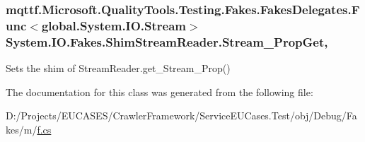 \hypertarget{class_system_1_1_i_o_1_1_fakes_1_1_shim_stream_reader_a8750bbc521c0510e122337b518f78aae}{
\subsubsection[{Stream\-\_\-\-Prop\-Get}]{\setlength{\rightskip}{0pt plus 5cm}mqttf.\-Microsoft.\-Quality\-Tools.\-Testing.\-Fakes.\-Fakes\-Delegates.\-Func$<$global.\-System.\-I\-O.\-Stream$>$ System.\-I\-O.\-Fakes.\-Shim\-Stream\-Reader.\-Stream\-\_\-\-Prop\-Get\hspace{0.3cm}{\ttfamily [get]}, {\ttfamily [set]}}}\label{class_system_1_1_i_o_1_1_fakes_1_1_shim_stream_reader_a8750bbc521c0510e122337b518f78aae}


Sets the shim of Stream\-Reader.\-get\-\_\-\-Stream\-\_\-\-Prop()



The documentation for this class was generated from the following file\-:\begin{DoxyCompactItemize}
\item 
D\-:/\-Projects/\-E\-U\-C\-A\-S\-E\-S/\-Crawler\-Framework/\-Service\-E\-U\-Cases.\-Test/obj/\-Debug/\-Fakes/m/\hyperlink{m_2f_8cs}{f.\-cs}\end{DoxyCompactItemize}
